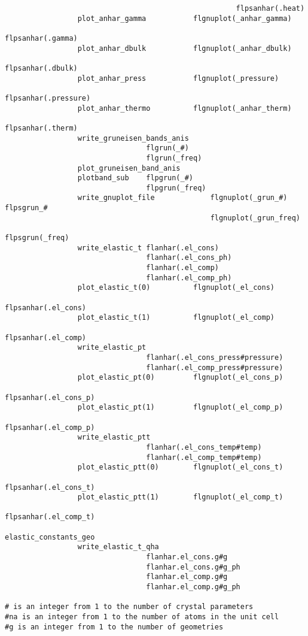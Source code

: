 \documentclass[12pt,a4paper,twoside]{report}
\begin{document}
\begin{footnotesize}
\begin{verbatim}
                                                      flpsanhar(.heat)
                 plot_anhar_gamma           flgnuplot(_anhar_gamma) 
                                                      flpsanhar(.gamma)
                 plot_anhar_dbulk           flgnuplot(_anhar_dbulk) 
                                                      flpsanhar(.dbulk)
                 plot_anhar_press           flgnuplot(_pressure)
                                                      flpsanhar(.pressure)
                 plot_anhar_thermo          flgnuplot(_anhar_therm) 
                                                      flpsanhar(.therm)
                 write_gruneisen_bands_anis
                                 flgrun(_#)
                                 flgrun(_freq)
                 plot_gruneisen_band_anis
                 plotband_sub    flpgrun(_#)
                                 flpgrun(_freq)
                 write_gnuplot_file             flgnuplot(_grun_#)   flpsgrun_#
                                                flgnuplot(_grun_freq) 
                                                                 flpsgrun(_freq)
                 write_elastic_t flanhar(.el_cons)
                                 flanhar(.el_cons_ph)
                                 flanhar(.el_comp)
                                 flanhar(.el_comp_ph)
                 plot_elastic_t(0)          flgnuplot(_el_cons)  
                                                       flpsanhar(.el_cons)
                 plot_elastic_t(1)          flgnuplot(_el_comp)  
                                                       flpsanhar(.el_comp)
                 write_elastic_pt 
                                 flanhar(.el_cons_press#pressure)
                                 flanhar(.el_comp_press#pressure)
                 plot_elastic_pt(0)         flgnuplot(_el_cons_p)      
                                                      flpsanhar(.el_cons_p)
                 plot_elastic_pt(1)         flgnuplot(_el_comp_p)      
                                                      flpsanhar(.el_comp_p)
                 write_elastic_ptt 
                                 flanhar(.el_cons_temp#temp)
                                 flanhar(.el_comp_temp#temp)
                 plot_elastic_ptt(0)        flgnuplot(_el_cons_t)      
                                                      flpsanhar(.el_cons_t)
                 plot_elastic_ptt(1)        flgnuplot(_el_comp_t)      
                                                      flpsanhar(.el_comp_t)

elastic_constants_geo
                 write_elastic_t_qha
                                 flanhar.el_cons.g#g
                                 flanhar.el_cons.g#g_ph
                                 flanhar.el_comp.g#g
                                 flanhar.el_comp.g#g_ph

# is an integer from 1 to the number of crystal parameters
#na is an integer from 1 to the number of atoms in the unit cell
#g is an integer from 1 to the number of geometries
\end{verbatim} 
\end{footnotesize}
\end{document}
